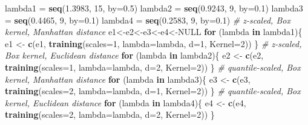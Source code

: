 \documentclass[12pt]{article}
\newenvironment{Shaded}{\begin{snugshade}}{\end{snugshade}}
\newcommand{\AttributeTok}[1]{\textcolor[rgb]{0.13,0.29,0.53}{#1}}
\newcommand{\CommentTok}[1]{\textcolor[rgb]{0.56,0.35,0.01}{\textit{#1}}}
\newcommand{\ConstantTok}[1]{\textcolor[rgb]{0.56,0.35,0.01}{#1}}
\newcommand{\ControlFlowTok}[1]{\textcolor[rgb]{0.13,0.29,0.53}{\textbf{#1}}}
\newcommand{\DecValTok}[1]{\textcolor[rgb]{0.00,0.00,0.81}{#1}}
\newcommand{\FloatTok}[1]{\textcolor[rgb]{0.00,0.00,0.81}{#1}}
\newcommand{\FunctionTok}[1]{\textcolor[rgb]{0.13,0.29,0.53}{\textbf{#1}}}
\newcommand{\NormalTok}[1]{#1}
\newcommand{\OtherTok}[1]{\textcolor[rgb]{0.56,0.35,0.01}{#1}}
\begin{document}
\begin{Shaded}
\begin{Highlighting}[]
\NormalTok{lambda1 }\OtherTok{=} \FunctionTok{seq}\NormalTok{(}\FloatTok{1.3983}\NormalTok{, }\DecValTok{15}\NormalTok{, }\AttributeTok{by=}\FloatTok{0.5}\NormalTok{)}
\NormalTok{lambda2 }\OtherTok{=} \FunctionTok{seq}\NormalTok{(}\FloatTok{0.9243}\NormalTok{, }\DecValTok{9}\NormalTok{, }\AttributeTok{by=}\FloatTok{0.1}\NormalTok{)}
\NormalTok{lambda3 }\OtherTok{=} \FunctionTok{seq}\NormalTok{(}\FloatTok{0.4465}\NormalTok{, }\DecValTok{9}\NormalTok{, }\AttributeTok{by=}\FloatTok{0.1}\NormalTok{)}
\NormalTok{lambda4 }\OtherTok{=} \FunctionTok{seq}\NormalTok{(}\FloatTok{0.2583}\NormalTok{, }\DecValTok{9}\NormalTok{, }\AttributeTok{by=}\FloatTok{0.1}\NormalTok{)}
\CommentTok{\# z{-}scaled, Box kernel, Manhattan distance}
\NormalTok{e1}\OtherTok{\textless{}{-}}\NormalTok{e2}\OtherTok{\textless{}{-}}\NormalTok{e3}\OtherTok{\textless{}{-}}\NormalTok{e4}\OtherTok{\textless{}{-}}\ConstantTok{NULL}
\ControlFlowTok{for}\NormalTok{ (lambda }\ControlFlowTok{in}\NormalTok{ lambda1)\{}
\NormalTok{e1 }\OtherTok{\textless{}{-}} \FunctionTok{c}\NormalTok{(e1, }\FunctionTok{training}\NormalTok{(}\AttributeTok{scales=}\DecValTok{1}\NormalTok{, }\AttributeTok{lambda=}\NormalTok{lambda, }\AttributeTok{d=}\DecValTok{1}\NormalTok{, }\AttributeTok{Kernel=}\DecValTok{2}\NormalTok{))}
\NormalTok{\}}
\CommentTok{\# z{-}scaled, Box kernel, Euclidean distance}
\ControlFlowTok{for}\NormalTok{ (lambda }\ControlFlowTok{in}\NormalTok{ lambda2)\{}
\NormalTok{e2 }\OtherTok{\textless{}{-}} \FunctionTok{c}\NormalTok{(e2, }\FunctionTok{training}\NormalTok{(}\AttributeTok{scales=}\DecValTok{1}\NormalTok{, }\AttributeTok{lambda=}\NormalTok{lambda, }\AttributeTok{d=}\DecValTok{2}\NormalTok{, }\AttributeTok{Kernel=}\DecValTok{2}\NormalTok{))}
\NormalTok{\}}
\CommentTok{\# quantile{-}scaled, Box kernel, Manhattan distance}
\ControlFlowTok{for}\NormalTok{ (lambda }\ControlFlowTok{in}\NormalTok{ lambda3)\{}
\NormalTok{e3 }\OtherTok{\textless{}{-}} \FunctionTok{c}\NormalTok{(e3, }\FunctionTok{training}\NormalTok{(}\AttributeTok{scales=}\DecValTok{2}\NormalTok{, }\AttributeTok{lambda=}\NormalTok{lambda, }\AttributeTok{d=}\DecValTok{1}\NormalTok{, }\AttributeTok{Kernel=}\DecValTok{2}\NormalTok{))}
\NormalTok{\}}
\CommentTok{\# quantile{-}scaled, Box kernel, Euclidean distance}
\ControlFlowTok{for}\NormalTok{ (lambda }\ControlFlowTok{in}\NormalTok{ lambda4)\{}
\NormalTok{e4 }\OtherTok{\textless{}{-}} \FunctionTok{c}\NormalTok{(e4, }\FunctionTok{training}\NormalTok{(}\AttributeTok{scales=}\DecValTok{2}\NormalTok{, }\AttributeTok{lambda=}\NormalTok{lambda, }\AttributeTok{d=}\DecValTok{2}\NormalTok{, }\AttributeTok{Kernel=}\DecValTok{2}\NormalTok{))}
\NormalTok{\}}
\end{Highlighting}
\end{Shaded}
\end{document}
